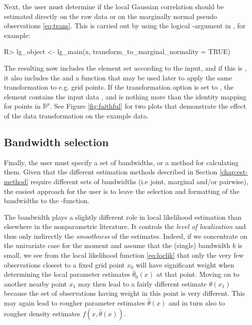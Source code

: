 Next, the user must determine if the local Gaussian correlation should be estimated directly on the raw data or on the marginally normal pseudo observations \eqref{eq:trans}. This is carried out by using the logical -argument in , for example:

\begin{example}
R> lg_object <- lg_main(x, transform_to_marginal_normality = TRUE)
\end{example}

The resulting  now includes the element  set according to the input, and if this is , it also includes the  and a function  that may be used later to apply the same transformation to e.g. grid points. If the transformation option is set to , the  element contains the input data , and  is nothing more than the identity mapping for points in \(\mathbb{R}^p\). See Figure \ref{fig:faithful} for two plots that demonstrate the effect of the data transformation on the example data.

\subsection{Bandwidth selection}\label{chap:bw}

Finally, the user must specify a set of bandwidths, or a method for calculating them. Given that the different estimation methods described in Section \ref{chap:est-method} require different sets of bandwidths (i.e joint, marginal and/or pairwise), the easiest approach for the user is to leave the selection and formatting of the bandwidths to the -function.

The bandwidth plays a slightly different role in local likelihood estimation than elsewhere in the nonparametric literature. It controls the \emph{level of localization} and thus only indirectly the \emph{smoothness} of the estimates. Indeed, if we concentrate on the univariate case for the moment and assume that the (single) bandwidth \(b\) is small, we see from the local likelihood function \eqref{eq:loclik} that only the very few observations closest to a fixed grid point \(x_0\) will have significant weight when determining the
local parameter estimates \(\widehat\theta_0(x)\) at that point. Moving on to another nearby point \(x_1\) may then lead to a fairly different estimate \(\widehat\theta(x_1)\) because the set of observations having weight in this point is very different. This may again lead to rougher parameter estimates \(\widehat\theta(x)\) and in turn also to rougher density estimates \(f(x,\widehat\theta(x))\).

